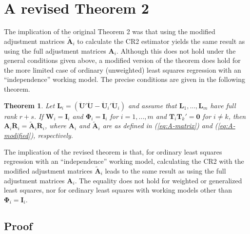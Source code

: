 \documentclass[12pt]{article}
\newtheorem*{thm}{Theorem}
\begin{document}
\hypertarget{a-revised-theorem-2}{%
\section{A revised Theorem 2}\label{a-revised-theorem-2}}

The implication of the original Theorem 2 was that using the modified
adjustment matrices \(\tilde{\mathbf{A}}_i\) to calculate the CR2
estimator yields the same result as using the full adjustment matrices
\(\mathbf{A}_i\). Although this does not hold under the general
conditions given above, a modified version of the theorem does hold for
the more limited case of ordinary (unweighted) least squares regression
with an ``independence'' working model. The precise conditions are given
in the following theorem.

\begin{thm}
\label{thm:absorb}
Let $\mathbf{L}_i = \left(\mathbf{\ddot{U}}'\mathbf{\ddot{U}} - \mathbf{\ddot{U}}_i'\mathbf{\ddot{U}}_i\right)$ and assume that $\mathbf{L}_1,...,\mathbf{L}_m$ have full rank $r + s$. If $\mathbf{W}_i = \mathbf{I}_i$ and $\boldsymbol\Phi_i = \mathbf{I}_i$ for $i = 1,...,m$ and $\mathbf{T}_i \mathbf{T}_k' = \mathbf{0}$ for $i \neq k$, then $\mathbf{A}_i \mathbf{\ddot{R}}_i = \mathbf{\tilde{A}}_i \mathbf{\ddot{R}}_i$, where $\mathbf{A}_i$ and $\tilde{\mathbf{A}}_i$ are as defined in (\ref{eq:A-matrix}) and (\ref{eq:A-modified}), respectively.
\end{thm}

The implication of the revised theorem is that, for ordinary least
squares regression with an ``independence'' working model, calculating
the CR2 with the modified adjustment matrices \(\tilde{\mathbf{A}}_i\)
leads to the same result as using the full adjustment matrices
\(\mathbf{A}_i\). The equality does not hold for weighted or generalized
least squares, nor for ordinary least squares with working models other
than \(\boldsymbol\Phi_i = \mathbf{I}_i\).

\hypertarget{proof}{%
\subsection{Proof}\label{proof}}
\end{document}
